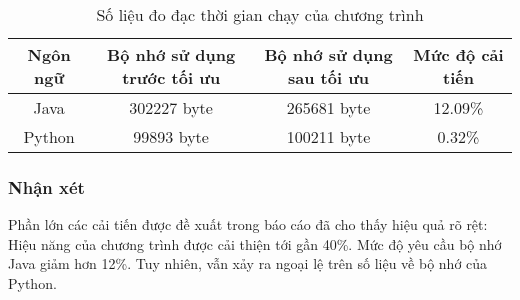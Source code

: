 \documentclass{article}
\begin{document}
    \begin{table}[ht]
        \begin{center}
        \begin{adjustbox}{width=\textwidth}
            \begin{tabular}{|c|c|c|c|}
                \hline
                Ngôn ngữ & Bộ nhớ sử dụng trước tối ưu & Bộ nhớ sử dụng sau tối ưu & Mức độ cải tiến \\
                \hline
                Java & 302227 byte & 265681 byte & 12.09\% \\
                Python & 99893 byte & 100211 byte & 0.32\% \\
                \hline
            \end{tabular}
        \end{adjustbox}
        \end{center}
        \caption{Số liệu đo đạc thời gian chạy của chương trình}
    \end{table}

    \subsubsection{Nhận xét}
    Phần lớn các cải tiến được đề xuất trong báo cáo đã cho thấy hiệu quả rõ rệt:
    Hiệu năng của chương trình được cải thiện tới gần 40\%. Mức độ yêu cầu bộ nhớ 
    Java giảm hơn 12\%. Tuy nhiên, vẫn xảy ra ngoại lệ trên số liệu về bộ nhớ của 
    Python.
\end{document}
